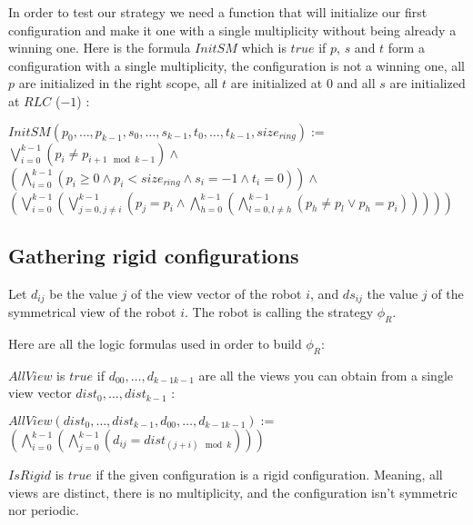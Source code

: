 \documentclass{article}
\begin{document}
In order to test our strategy we need a function that will initialize our first configuration and make it one with a single multiplicity without being already a winning one. Here is the formula $InitSM$ which is $true$ if $p$, $s$ and $t$ form a configuration with a single multiplicity, the configuration is not a winning one, all $p$ are initialized in the right scope, all $t$ are initialized at $0$ and all $s$ are initialized at $RLC$ ($-1$) :

\begin{center}
    
$InitSM(p_{0},\dots, p_{k-1}, s_{0}, \dots, s_{k-1}, t_{0}, \dots, t_{k-1}, size_{ring}):=$\\
$\bigvee_{i = 0}^{k-1}( p_{i} \not= p_{i+1 \mod{k-1}} ) \land$\\
$(\bigwedge_{i = 0}^{k-1} ( p_{i} \geq 0 \land p_{i} <  size_{ring} \land s_{i} = -1 \land t_{i} = 0)) \land$\\
$(\bigvee_{i = 0}^{k-1} (\bigvee_{j = 0, j\not=i}^{k-1} (p_{j} = p_{i} \land \bigwedge_{h = 0}^{k-1} ( \bigwedge_{l = 0, l\not=h}^{k-1} (p_{h} \not= p_{l} \lor p_{h} = p_{i}) ) ) ) )$
\end{center}

\subsection{Gathering rigid configurations}

Let $d_{ij}$ be the value $j$ of the view vector of the robot $i$, and $ds_{ij}$ the value $j$ of the symmetrical 
view of the robot $i$.
The robot is calling the strategy $\phi_R$.

Here are all the logic formulas used in order to build $\phi_R$:\newline


$AllView$ is $true$ if $d_{00}, \ldots ,d_{k-1k-1}$ are all the views you can obtain from a single view vector $dist_{0}, \ldots ,dist_{k-1}$ :

\begin{center}
    
$AllView(dist_{0}, \ldots ,dist_{k-1}, d_{00}, \ldots ,d_{k-1k-1}):=$\\
$(\bigwedge_{i=0}^{k-1} (\bigwedge_{j=0}^{k-1} (d_{ij} = dist_{(j+i) \mod{k}}) ) )$
\end{center}

$IsRigid$ is $true$ if the given configuration is a rigid configuration. Meaning, all views are distinct, there is no multiplicity, and the configuration isn't symmetric nor periodic.
\end{document}
